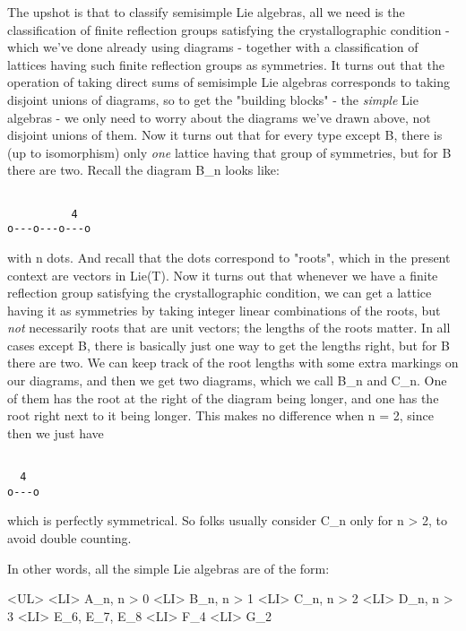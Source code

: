 The upshot is that to classify semisimple Lie algebras, all we need is
the classification of finite reflection groups satisfying the
crystallographic condition - which we've done already using diagrams
- together with a classification of lattices having such finite
reflection groups as symmetries.  It turns out that the operation of
taking direct sums of semisimple Lie algebras corresponds to taking
disjoint unions of diagrams, so to get the "building blocks" - the
\emph{simple} Lie algebras - we only need to worry about the diagrams we've
drawn above, not disjoint unions of them.  Now it turns out that for
every type except B, there is (up to isomorphism) only \emph{one} lattice
having that group of symmetries, but for B there are two.  Recall the
diagram B_{n} looks like:


\begin{verbatim}

          4
o---o---o---o
\end{verbatim}
    

with n dots.  And recall that the dots correspond to
"roots", which in the present context are vectors in Lie(T).
Now it turns out that whenever we have a finite reflection group
satisfying the crystallographic condition, we can get a lattice having
it as symmetries by taking integer linear combinations of the roots,
but \emph{not} necessarily roots that are unit vectors; the lengths
of the roots matter.  In all cases except B, there is basically just
one way to get the lengths right, but for B there are two.  We can
keep track of the root lengths with some extra markings on our
diagrams, and then we get two diagrams, which we call B_{n}
and C_{n}.  One of them has the root at the right of the
diagram being longer, and one has the root right next to it being
longer.  This makes no difference when n = 2, since then we just have


\begin{verbatim}

  4
o---o
\end{verbatim}
    

which is perfectly symmetrical.  So folks usually consider C_{n}
only for n > 2, to avoid double counting.  

In other words, all the simple Lie algebras are of the form:

<UL>
<LI>
A_{n}, n > 0
<LI>
B_{n}, n > 1
<LI>
C_{n}, n > 2
<LI>
D_{n}, n > 3
<LI>
E_{6}, E_{7}, E_{8}
<LI>
F_{4}
<LI>
G_{2}


